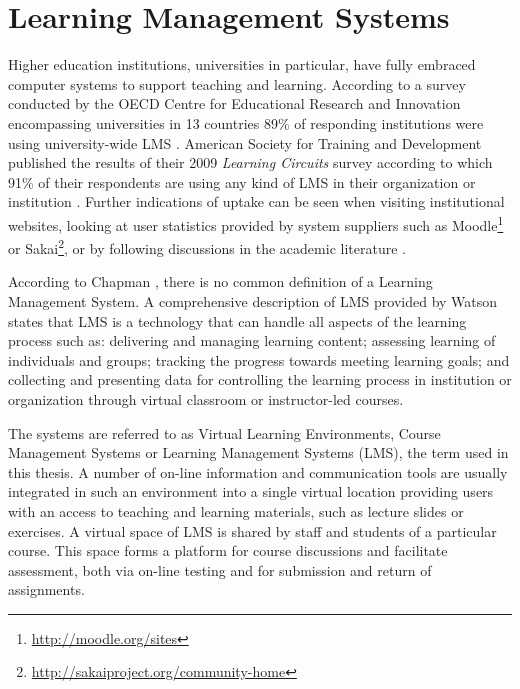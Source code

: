 \section{Learning Management Systems}
Higher education institutions, universities in particular, have fully embraced
computer systems to support teaching and learning. According to a survey
conducted by the OECD Centre for Educational Research and Innovation
encompassing universities in 13 countries 89\% of responding institutions were
using university-wide LMS \citep{OECD2005}. American Society for Training and
Development published the results of their 2009 \textit{Learning Circuits}
survey according to which 91\% of their respondents are using any kind of LMS in
their organization or institution \citep{Ellis2009}. Further indications of
uptake can be seen when visiting institutional websites, looking at user
statistics provided by system suppliers such as
Moodle\footnote{\url{http://moodle.org/sites}} or
Sakai\footnote{\url{http://sakaiproject.org/community-home}}, or by following
discussions in the academic literature \citep{Browne2006,Collis2004}.

According to Chapman \citeyearpar{Chapman2009}, there is no common definition of
a Learning Management System. A comprehensive description of LMS provided by
Watson \citeyearpar{Watson2007} states that LMS is a technology that can handle
all aspects of the learning process such as: delivering and managing learning
content; assessing learning of individuals and groups; tracking the progress
towards meeting learning goals; and collecting and presenting data for
controlling the learning process in institution or organization through virtual
classroom or instructor-led courses.

The systems are referred to as Virtual Learning Environments, Course Management
Systems or Learning Management Systems (LMS), the term used in this thesis. A
number of on-line information and communication tools are usually integrated in
such an environment into a single virtual location \citep{Morgan-Klein2007}
providing users with an access to teaching and learning materials, such as
lecture slides or exercises. A virtual space of LMS is shared by staff and
students of a particular course. This space forms a platform for course
discussions and facilitate assessment, both via on-line testing and for
submission and return of assignments.

